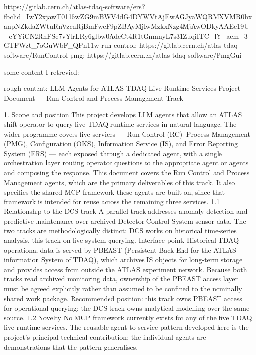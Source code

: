 https://gitlab.cern.ch/atlas-tdaq-software/ers?fbclid=IwY2xjawT0115wZG9mBWV4dG4DYWVtAjEwAGJyaWQRMXVMR0hxanpNZkdaZWtuRnVzcnRjBmFwcF9pZBAyMjIwMzkxNzg4MjAwODkyAAEe19U_eYYiCN2RnFSe7vYlrLRy6glbw0AdeCt4R1tGnmnyL7s31ZuqiITC_lY_aem_3GTFWzt_7oGuWbF_QPn11w
run control: https://gitlab.cern.ch/atlas-tdaq-software/RunControl
pmg: https://gitlab.cern.ch/atlas-tdaq-software/PmgGui


some content I retrevied:

rough content: LLM Agents for ATLAS TDAQ Live Runtime Services
Project Document — Run Control and Process Management Track

1. Scope and position
This project develops LLM agents that allow an ATLAS shift operator to query live TDAQ runtime services in natural language. The wider programme covers five services — Run Control (RC), Process Management (PMG), Configuration (OKS), Information Service (IS), and Error Reporting System (ERS) — each exposed through a dedicated agent, with a single orchestration layer routing operator questions to the appropriate agent or agents and composing the response.
This document covers the Run Control and Process Management agents, which are the primary deliverables of this track. It also specifies the shared MCP framework these agents are built on, since that framework is intended for reuse across the remaining three services.
1.1 Relationship to the DCS track
A parallel track addresses anomaly detection and predictive maintenance over archived Detector Control System sensor data. The two tracks are methodologically distinct: DCS works on historical time-series analysis, this track on live-system querying.
Interface point. Historical TDAQ operational data is served by PBEAST (Persistent Back-End for the ATLAS information System of TDAQ), which archives IS objects for long-term storage and provides access from outside the ATLAS experiment network. Because both tracks read archived monitoring data, ownership of the PBEAST access layer must be agreed explicitly rather than assumed to be confined to the nominally shared work package. Recommended position: this track owns PBEAST access for operational querying; the DCS track owns analytical modelling over the same source.
1.2 Novelty
No MCP framework currently exists for any of the five TDAQ live runtime services. The reusable agent-to-service pattern developed here is the project's principal technical contribution; the individual agents are demonstrations that the pattern generalises.


